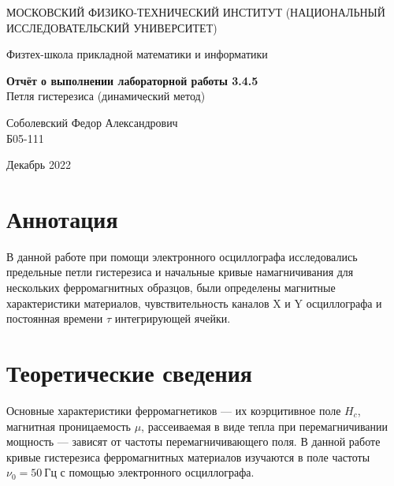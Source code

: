 \documentclass[a4paper, 12pt]{article}
\begin{document}
	\begin{titlepage}
	\begin{center}
		{\large МОСКОВСКИЙ ФИЗИКО-ТЕХНИЧЕСКИЙ ИНСТИТУТ (НАЦИОНАЛЬНЫЙ ИССЛЕДОВАТЕЛЬСКИЙ УНИВЕРСИТЕТ)}
	\end{center}
	\begin{center}
		{\large Физтех-школа прикладной математики и информатики}
	\end{center}
	
	
	\vspace{4.5cm}
	{\huge
		\begin{center}
			{\bf Отчёт о выполнении лабораторной работы 3.4.5}\\
			Петля гистерезиса (динамический метод)
		\end{center}
	}
	\vspace{1cm}
	\begin{center}
		{\large Соболевский Федор Александрович \\
			\vspace{0.2cm}
			Б05-111}
	\end{center}
	\vspace{8cm}
	\begin{center}
		Декабрь 2022
	\end{center}
\end{titlepage}

\section{Аннотация}

В данной работе при помощи электронного осциллографа исследовались предельные петли гистерезиса и начальные кривые намагничивания для нескольких ферромагнитных образцов, были определены магнитные характеристики материалов, чувствительность каналов X и Y осциллографа и постоянная времени $\tau$ интегрирующей ячейки.

\section{Теоретические сведения}

Основные характеристики
ферромагнетиков — их коэрцитивное поле $H_c$, магнитная проницаемость
$\mu$, рассеиваемая в виде тепла при перемагничивании мощность — зависят
от частоты перемагничивающего поля. В данной работе кривые гистерезиса ферромагнитных материалов изучаются в поле частоты $\nu_0 = 50~Гц$
с помощью электронного осциллографа.
\end{document}

